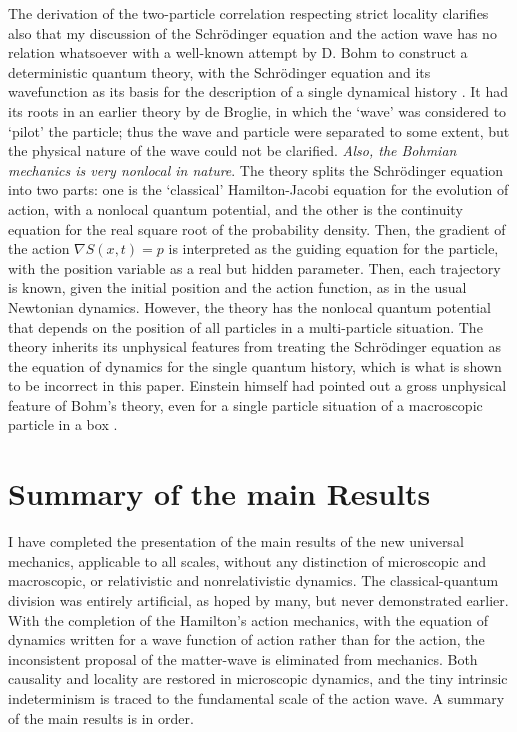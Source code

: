 The derivation of the two-particle correlation respecting strict locality clarifies also that
my discussion of the Schr\"{o}dinger equation and the action wave has no relation whatsoever
with a well-known attempt by D. Bohm to construct a deterministic quantum theory, with
the Schr\"{o}dinger equation and its wavefunction as its basis for the description of a single
dynamical history \cite{chap14-key10}. It had its roots in an earlier theory by de Broglie, in which the
‘wave' was considered to `pilot' the particle; thus the wave and particle were separated to
some extent, but the physical nature of the wave could not be clarified. \textit{Also, the Bohmian
mechanics is very nonlocal in nature}. The theory splits the Schr\"{o}dinger equation into two
parts: one is the `classical' Hamilton-Jacobi equation for the evolution of action, with a nonlocal 
quantum potential, and the other is the continuity equation for the real square root of
the probability density. Then, the gradient of the action $\nabla S(x, t) = p$ is interpreted as the
guiding equation for the particle, with the position variable as a real but hidden parameter.
Then, each trajectory is known, given the initial position and the action function, as in the
usual Newtonian dynamics. However, the theory has the nonlocal quantum potential that
depends on the position of all particles in a multi-particle situation. The theory inherits its
unphysical features from treating the Schr\"{o}dinger equation as the equation of dynamics for
the single quantum history, which is what is shown to be incorrect in this paper. Einstein
himself had pointed out a gross unphysical feature of Bohm's theory, even for a single particle
situation of a macroscopic particle in a box \cite{chap14-key11}.

\section{Summary of the main Results}\label{c14-sec8}

I have completed the presentation of the main results of the new universal mechanics,
applicable to all scales, without any distinction of microscopic and macroscopic, or relativistic and nonrelativistic dynamics. The classical-quantum division was entirely artificial, as hoped by many, but never demonstrated earlier. With the completion of the Hamilton's action mechanics, with the equation of dynamics written for a wave function of action rather than for the action, the inconsistent proposal of the matter-wave is eliminated from mechanics. Both causality and locality are restored in microscopic dynamics, and the tiny intrinsic indeterminism is traced to the fundamental scale of the action wave. A summary of the main results is in order.

